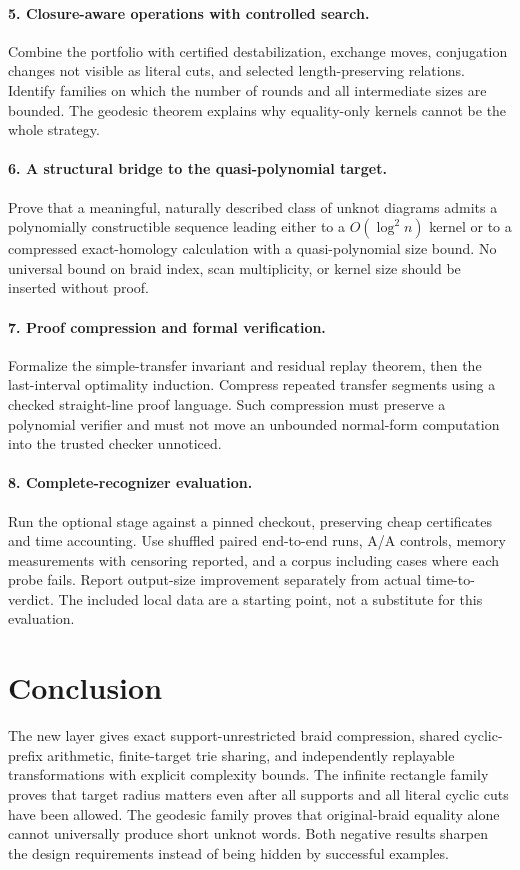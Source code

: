 \documentclass[11pt,a4paper]{article}
\theoremstyle{definition}\newtheorem{definition}[theorem]{Definition}
\theoremstyle{remark}\newtheorem{remark}[theorem]{Remark}
\begin{document}
\paragraph{5. Closure-aware operations with controlled search.}
Combine the portfolio with certified destabilization, exchange moves,
conjugation changes not visible as literal cuts, and selected
length-preserving relations. Identify families on which the number of
rounds and all intermediate sizes are bounded. The geodesic theorem
explains why equality-only kernels cannot be the whole strategy.

\paragraph{6. A structural bridge to the quasi-polynomial target.}
Prove that a meaningful, naturally described class of unknot diagrams
admits a polynomially constructible sequence leading either to a
$O(\log^2 n)$ kernel or to a compressed exact-homology calculation with a
quasi-polynomial size bound. No universal bound on braid index, scan
multiplicity, or kernel size should be inserted without proof.

\paragraph{7. Proof compression and formal verification.}
Formalize the simple-transfer invariant and residual replay theorem,
then the last-interval optimality induction. Compress repeated transfer
segments using a checked straight-line proof language. Such compression
must preserve a polynomial verifier and must not move an unbounded
normal-form computation into the trusted checker unnoticed.

\paragraph{8. Complete-recognizer evaluation.}
Run the optional stage against a pinned checkout, preserving cheap
certificates and time accounting. Use shuffled paired end-to-end runs,
A/A controls, memory measurements with censoring reported, and a corpus
including cases where each probe fails. Report output-size improvement
separately from actual time-to-verdict. The included local data are a
starting point, not a substitute for this evaluation.

\section{Conclusion}
The new layer gives exact support-unrestricted braid compression, shared
cyclic-prefix arithmetic, finite-target trie sharing, and independently
replayable transformations with explicit complexity bounds. The infinite
rectangle family proves that target radius matters even after all supports
and all literal cyclic cuts have been allowed. The geodesic family proves
that original-braid equality alone cannot universally produce short unknot
words. Both negative results sharpen the design requirements instead of
being hidden by successful examples.
\end{document}
